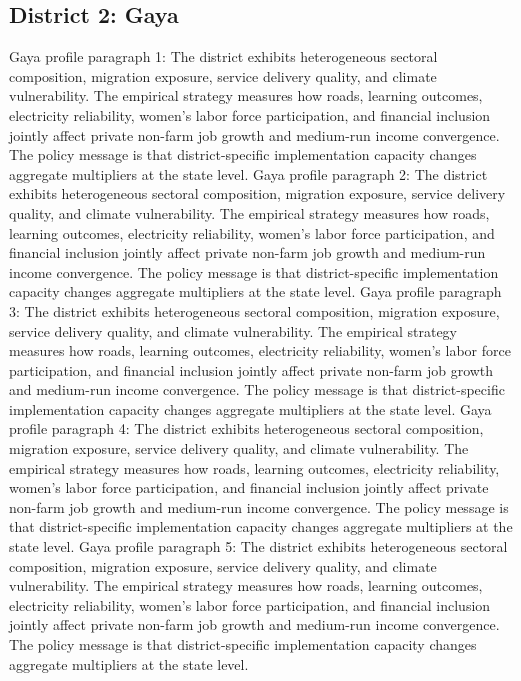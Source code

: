 \documentclass[preprint,12pt]{elsarticle}
\begin{document}
\subsection{District 2: Gaya}
Gaya profile paragraph 1: The district exhibits heterogeneous sectoral composition, migration exposure, service delivery quality, and climate vulnerability. The empirical strategy measures how roads, learning outcomes, electricity reliability, women's labor force participation, and financial inclusion jointly affect private non-farm job growth and medium-run income convergence. The policy message is that district-specific implementation capacity changes aggregate multipliers at the state level.
Gaya profile paragraph 2: The district exhibits heterogeneous sectoral composition, migration exposure, service delivery quality, and climate vulnerability. The empirical strategy measures how roads, learning outcomes, electricity reliability, women's labor force participation, and financial inclusion jointly affect private non-farm job growth and medium-run income convergence. The policy message is that district-specific implementation capacity changes aggregate multipliers at the state level.
Gaya profile paragraph 3: The district exhibits heterogeneous sectoral composition, migration exposure, service delivery quality, and climate vulnerability. The empirical strategy measures how roads, learning outcomes, electricity reliability, women's labor force participation, and financial inclusion jointly affect private non-farm job growth and medium-run income convergence. The policy message is that district-specific implementation capacity changes aggregate multipliers at the state level.
Gaya profile paragraph 4: The district exhibits heterogeneous sectoral composition, migration exposure, service delivery quality, and climate vulnerability. The empirical strategy measures how roads, learning outcomes, electricity reliability, women's labor force participation, and financial inclusion jointly affect private non-farm job growth and medium-run income convergence. The policy message is that district-specific implementation capacity changes aggregate multipliers at the state level.
Gaya profile paragraph 5: The district exhibits heterogeneous sectoral composition, migration exposure, service delivery quality, and climate vulnerability. The empirical strategy measures how roads, learning outcomes, electricity reliability, women's labor force participation, and financial inclusion jointly affect private non-farm job growth and medium-run income convergence. The policy message is that district-specific implementation capacity changes aggregate multipliers at the state level.
\end{document}
